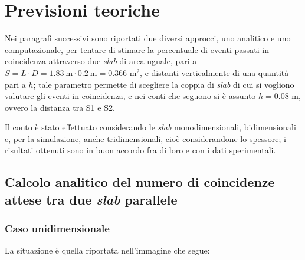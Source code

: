 \section{Previsioni teoriche}
Nei paragrafi successivi sono riportati due diversi approcci, uno analitico e uno computazionale, per tentare di stimare la percentuale di eventi passati in coincidenza attraverso due \emph{slab} di area uguale, pari a $S=L \cdot D = 1.83 \ \mbox{m} \cdot 0.2 \ \mbox{m} =0.366$ m$^2$, e distanti verticalmente di una quantità pari a $h$; tale parametro permette di scegliere la coppia di \emph{slab} di cui si vogliono valutare gli eventi in coincidenza, e nei conti che seguono si è assunto $h=0.08$ m, ovvero la distanza tra S1 e S2.

Il conto è stato effettuato considerando le \emph{slab} monodimensionali, bidimensionali e, per la simulazione, anche tridimensionali, cioè considerandone lo spessore; i risultati ottenuti sono in buon accordo fra di loro e con i dati sperimentali.
\subsection{Calcolo analitico del numero di coincidenze attese tra due \emph{slab} parallele}
\subsubsection{Caso unidimensionale}
La situazione è quella riportata nell'immagine che segue:
\newline
\begin{center}
\end{center}

